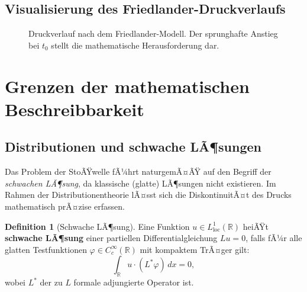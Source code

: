 ﻿\documentclass[12pt,a4paper]{article}
\theoremstyle{definition}
\newtheorem{definition}[theorem]{Definition}
\theoremstyle{remark}
\begin{document}
\subsection{Visualisierung des Friedlander-Druckverlaufs}

\begin{figure}[H]
\centering
{}
\caption{Druckverlauf nach dem Friedlander-Modell. Der sprunghafte Anstieg bei $t_0$ stellt die mathematische Herausforderung dar.}
\end{figure}

\section{Grenzen der mathematischen Beschreibbarkeit}

\subsection{Distributionen und schwache LÃ¶sungen}

Das Problem der StoÃŸwelle fÃ¼hrt naturgemÃ¤ÃŸ auf den Begriff der \emph{schwachen LÃ¶sung}, da klassische (glatte) LÃ¶sungen nicht existieren. Im Rahmen der Distributionentheorie lÃ¤sst sich die DiskontinuitÃ¤t des Drucks mathematisch prÃ¤zise erfassen.

\begin{definition}[Schwache LÃ¶sung]
\label{def:schwache_loesung}
Eine Funktion $u \in L^1_{\text{loc}}(\mathbb{R})$ heiÃŸt \textbf{schwache LÃ¶sung} einer partiellen Differentialgleichung $Lu = 0$, falls fÃ¼r alle glatten Testfunktionen $\varphi \in C_c^\infty(\mathbb{R})$ mit kompaktem TrÃ¤ger gilt:
\begin{equation}
\int_\mathbb{R} u \cdot (L^*\varphi)\,dx = 0,
\end{equation}
wobei $L^*$ der zu $L$ formale adjungierte Operator ist.
\end{definition}
\end{document}
